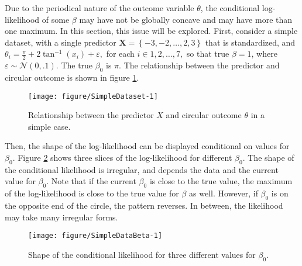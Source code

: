 \documentclass[12pt,a4paper]{article}\usepackage[]{graphicx}\usepackage[]{color}
\makeatletter
\def\maxwidth{ %
  \ifdim\Gin@nat@width>\linewidth
    \linewidth
  \else
    \Gin@nat@width
  \fi
}
\newenvironment{knitrout}{}{} %
\makeatother
\begin{document}
Due to the periodical nature of the outcome variable $\theta$, the conditional log-likelihood of some $\beta$ may have not be globally concave and may have more than one maximum. In this section, this issue will be explored. First, consider a simple dataset, with a single predictor $\boldsymbol{X} = \left\lbrace -3, -2, \dots, 2, 3 \right\rbrace $ that is standardized, and $\theta_i = \frac{\pi}{2} + 2 \tan^{-1} (x_i) + \varepsilon,$ for each $ i \in 1, 2, \dots, 7,$ so that true $\beta = 1$, where $\varepsilon \sim \mathcal{N}(0, .1)$. The true $\beta_0$ is $\pi$. The relationship between the predictor and circular outcome is shown in figure \ref{SimpleDataset}.


\begin{figure}
\label{SimpleDataset}
\begin{knitrout}
\color{fgcolor}

{\centering \texttt{[image: figure/SimpleDataset-1]} 

}



\end{knitrout}
\caption{Relationship between the predictor $X$ and circular outcome $\theta$ in a simple case.}
\label{SimpleDataset}
\end{figure}

Then, the shape of the log-likelihood can be displayed conditional on values for $\beta_0$. Figure \ref{SimpleDataBeta} shows three slices of the log-likelihood for different $\beta_0$. The shape of the conditional likelihood is irregular, and depends the data and the current value for $\beta_0$. Note that if the current $\beta_0$ is close to the true value, the maximum of the log-likelihood is close to the true value for $\beta$ as well. However, if $\beta_0$ is on the opposite end of the circle, the pattern reverses. In between, the likelihood may take many irregular forms.

\begin{figure}
\label{SimpleDataBeta}
\begin{knitrout}
\color{fgcolor}

{\centering \texttt{[image: figure/SimpleDataBeta-1]} 

}



\end{knitrout}
\caption{Shape of the conditional likelihood for three different values for $\beta_0$.}
\label{SimpleDataBeta}
\end{figure}
\end{document}
